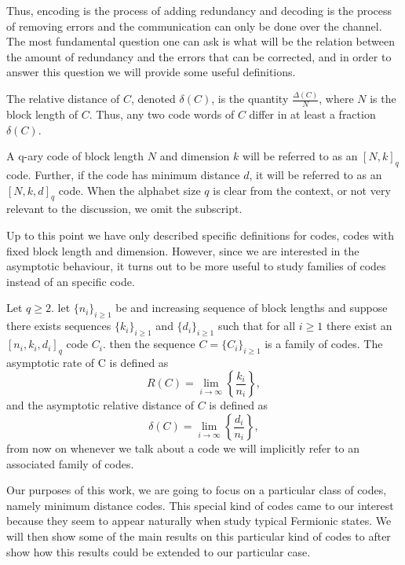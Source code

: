  Thus, encoding is the process of adding redundancy and decoding is the process of removing errors and the communication can only be done over the channel\cite{mackay_information_2003}. The most fundamental question one can ask is what will be the relation between the amount of redundancy and the errors that can be corrected, and in order to answer this question we will provide some useful definitions.

\indent The relative distance of $C$, denoted $\delta(C)$, is the quantity $\frac{\Delta(C)}{N}$, where $N$ is the block length of $C$. Thus, any two code words of $C$ differ in at least a fraction $\delta(C)$.
\begin{definition}[Notation]
 A q-ary code of block length $N$ and dimension $k$ will be referred to as an $[N,k]_q$ code. Further, if the code has minimum distance $d$, it will be referred to as an $[N,k,d]_q$ code. When the alphabet size $q$ is clear from the context, or not very relevant to the discussion, we omit the subscript.
\end{definition}

\indent Up to this point we have only described specific definitions for codes, codes with fixed block length and dimension. However, since we are interested in the asymptotic behaviour, it turns out to be more useful to study families of codes instead of an specific code.

\begin{definition}
 Let $q\geq 2$. let $\{n_i\}_{i\geq 1}$ be and increasing sequence of block lengths and suppose there exists sequences $\{k_i\}_{i\geq 1}$ and $\{d_i\}_{i\geq 1}$ such that for all $i\geq 1$ there exist an $[n_i,k_i,d_i]_q$ code $C_i$. then the sequence $C=\{C_i\}_{i\geq1}$ is a family of codes. The asymptotic rate of C is defined as
\begin{equation}
R(C)=\lim _{i \rightarrow \infty}\left\{\frac{k_{i}}{n_{i}}\right\},
\label{CH2:Rate_of_family_code}
\end{equation}
and the asymptotic relative distance of $C$ is defined as
\begin{equation}
\delta(C)=\lim _{i \rightarrow \infty}\left\{\frac{d_{i}}{n_{i}}\right\},
\label{CH2:Relative_distance_of_family_code}
\end{equation}
from now on whenever we talk about a code we will implicitly refer to an associated family of codes.
\end{definition}
\indent Our purposes of this work, we are going to focus on a particular class of codes, namely minimum distance codes. This special kind of codes came to our interest because they seem to appear naturally when study typical Fermionic states. We will then show some of the main results on this particular kind of codes to after show how this results could be extended to our particular case.\\

